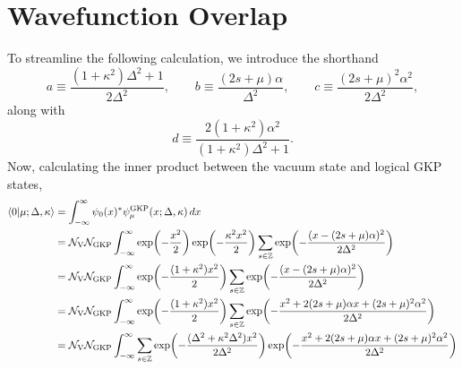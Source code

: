 \documentclass[11pt]{article}
\begin{document}
\section{Wavefunction Overlap}
To streamline the following calculation, we introduce the shorthand
\begin{equation}
    a \equiv \frac{(1+\kappa^2)\Delta^2 + 1}{2\Delta^2}, \qquad
    b \equiv \frac{(2s+\mu)\alpha}{\Delta^2}, \qquad
    c \equiv \frac{(2s+\mu)^2\alpha^2}{2\Delta^2},
    \label{eq:abc-def}
\end{equation}
along with
\begin{equation}
    d \equiv \frac{2(1+\kappa^2)\alpha^2}{(1+\kappa^2)\Delta^2 + 1}.
    \label{eq:d-def}
\end{equation}
Now, calculating the inner product between the vacuum state and logical GKP states,
\begin{align*}
    \braket{0}{\mu ; \Delta, \kappa} & = \int_{-\infty}^{\infty} \psi_0(x)^* \psi_{\mu}^{\mathrm{GKP}}(x; \Delta, \kappa) \, dx                                                                                                                                                                                                                                                \\
                                     & = \mathcal{N}_{\mathrm{V}} \mathcal{N}_{\mathrm{GKP}} \int_{-\infty}^{\infty}\exp\!\left(-\frac{x^2}{2}\right) \exp\!\left(-\frac{\kappa^2 x^2}{2}\right)
    \sum_{s \in \mathbb{Z}}
    \exp\!\left(-\frac{(x - (2s + \mu)\alpha)^2}{2\Delta^2}\right)
    \\
                                     & = \mathcal{N}_{\mathrm{V}} \mathcal{N}_{\mathrm{GKP}} \int_{-\infty}^{\infty} \exp\!\left(-\frac{(1 + \kappa^2) x^2}{2}\right)
    \sum_{s \in \mathbb{Z}}
    \exp\!\left(-\frac{(x - (2s + \mu)\alpha)^2}{2\Delta^2}\right)
    \\
                                     & = \mathcal{N}_{\mathrm{V}} \mathcal{N}_{\mathrm{GKP}} \int_{-\infty}^{\infty} \exp\!\left(-\frac{(1 + \kappa^2) x^2}{2}\right)
    \sum_{s \in \mathbb{Z}}
    \exp\!\left(-\frac{x^2 + 2(2s+\mu)\alpha x + (2s+\mu)^2 \alpha^2}{2\Delta^2}\right)
    \\
                                     & = \mathcal{N}_{\mathrm{V}} \mathcal{N}_{\mathrm{GKP}} \int_{-\infty}^{\infty} \sum_{s \in \mathbb{Z}} \exp\!\left(-\frac{(\Delta^2 + \kappa^2 \Delta^2) x^2}{2 \Delta^2}\right)
    \exp\!\left(-\frac{x^2 + 2(2s+\mu)\alpha x + (2s+\mu)^2 \alpha^2}{2\Delta^2}\right)
    \\

\end{align*}
\end{document}
